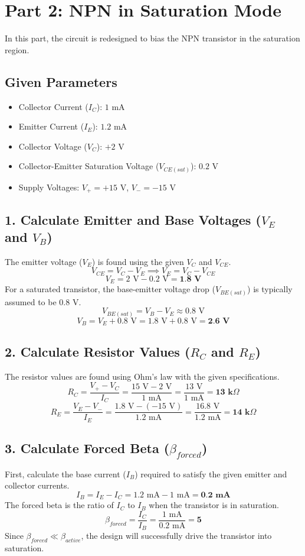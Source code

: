 \documentclass{article}
\begin{document}
\newpage

\section*{Part 2: NPN in Saturation Mode}
In this part, the circuit is redesigned to bias the NPN transistor in the saturation region.

\subsection*{Given Parameters}
\begin{itemize}
  \item Collector Current ($I_C$): $1 \text{ mA}$
  \item Emitter Current ($I_E$): $1.2 \text{ mA}$
  \item Collector Voltage ($V_C$): $+2 \text{ V}$
  \item Collector-Emitter Saturation Voltage ($V_{CE(sat)}$): $0.2 \text{ V}$
  \item Supply Voltages: $V_{+} = +15 \text{ V}$, $V_{-} = -15 \text{ V}$
\end{itemize}

\subsection*{1. Calculate Emitter and Base Voltages ($V_E$ and $V_B$)}
The emitter voltage ($V_E$) is found using the given $V_C$ and $V_{CE}$.
\[ V_{CE} = V_C - V_E \implies V_E = V_C - V_{CE} \]
\[ V_E = 2 \text{ V} - 0.2 \text{ V} = \textbf{1.8 V} \]
For a saturated transistor, the base-emitter voltage drop ($V_{BE(sat)}$) is typically assumed to be $0.8 \text{ V}$.
\[ V_{BE(sat)} = V_B - V_E \approx 0.8 \text{ V} \]
\[ V_B = V_E + 0.8 \text{ V} = 1.8 \text{ V} + 0.8 \text{ V} = \textbf{2.6 V} \]

\subsection*{2. Calculate Resistor Values ($R_C$ and $R_E$)}
The resistor values are found using Ohm's law with the given specifications.
\[ R_{C} = \frac{V_{+} - V_{C}}{I_{C}} = \frac{15 \text{ V} - 2 \text{ V}}{1 \text{ mA}} = \frac{13 \text{ V}}{1 \text{ mA}} = \textbf{13 k}\Omega \]
\[ R_{E} = \frac{V_{E} - V_{-}}{I_{E}} = \frac{1.8 \text{ V} - (-15 \text{ V})}{1.2 \text{ mA}} = \frac{16.8 \text{ V}}{1.2 \text{ mA}} = \textbf{14 k}\Omega \]

\subsection*{3. Calculate Forced Beta ($\beta_{forced}$)}
First, calculate the base current ($I_B$) required to satisfy the given emitter and collector currents.
\[ I_B = I_E - I_C = 1.2 \text{ mA} - 1 \text{ mA} = \textbf{0.2 mA} \]
The forced beta is the ratio of $I_C$ to $I_B$ when the transistor is in saturation.
\[ \beta_{forced} = \frac{I_C}{I_B} = \frac{1 \text{ mA}}{0.2 \text{ mA}} = \textbf{5} \]
Since $\beta_{forced} \ll \beta_{active}$, the design will successfully drive the transistor into saturation.
\end{document}
